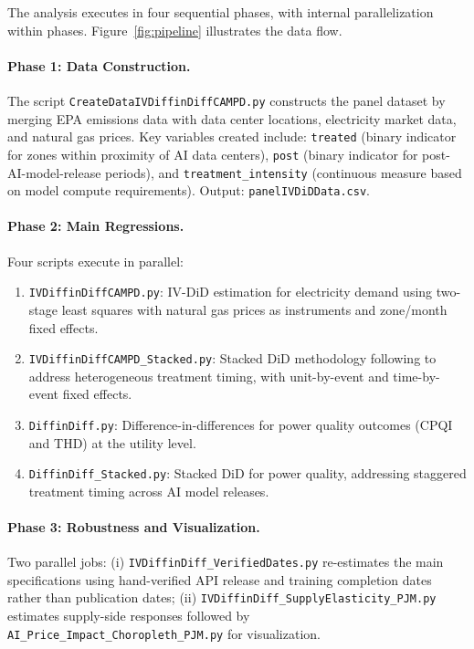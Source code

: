 \documentclass[a4paper,fleqn,longmktitle]{cas-sc}
\begin{document}
The analysis executes in four sequential phases, with internal parallelization within phases. Figure~\ref{fig:pipeline} illustrates the data flow.

\paragraph{Phase 1: Data Construction.} The script \texttt{CreateDataIVDiffinDiffCAMPD.py} constructs the panel dataset by merging EPA emissions data with data center locations, electricity market data, and natural gas prices. Key variables created include: \texttt{treated} (binary indicator for zones within proximity of AI data centers), \texttt{post} (binary indicator for post-AI-model-release periods), and \texttt{treatment\_intensity} (continuous measure based on model compute requirements). Output: \texttt{panelIVDiDData.csv}.

\paragraph{Phase 2: Main Regressions.} Four scripts execute in parallel:
\begin{enumerate}[noitemsep,topsep=0pt]
    \item \texttt{IVDiffinDiffCAMPD.py}: IV-DiD estimation for electricity demand using two-stage least squares with natural gas prices as instruments and zone/month fixed effects.
    \item \texttt{IVDiffinDiffCAMPD\_Stacked.py}: Stacked DiD methodology following \citet{cengiz2019effect} to address heterogeneous treatment timing, with unit-by-event and time-by-event fixed effects.
    \item \texttt{DiffinDiff.py}: Difference-in-differences for power quality outcomes (CPQI and THD) at the utility level.
    \item \texttt{DiffinDiff\_Stacked.py}: Stacked DiD for power quality, addressing staggered treatment timing across AI model releases.
\end{enumerate}

\paragraph{Phase 3: Robustness and Visualization.} Two parallel jobs: (i) \texttt{IVDiffinDiff\_VerifiedDates.py} re-estimates the main specifications using hand-verified API release and training completion dates rather than publication dates; (ii) \texttt{IVDiffinDiff\_SupplyElasticity\_PJM.py} estimates supply-side responses followed by \texttt{AI\_Price\_Impact\_Choropleth\_PJM.py} for visualization.
\end{document}
